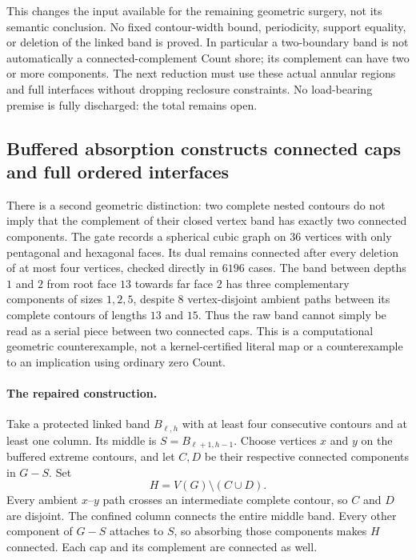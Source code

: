 This changes the input available for the remaining geometric surgery,
not its semantic conclusion. No fixed contour-width bound, periodicity,
support equality, or deletion of the linked band is proved. In particular
a two-boundary band is not automatically a connected-complement Count
shore; its complement can have two or more components. The next reduction must
use these actual annular regions and full interfaces without dropping
reclosure constraints. No load-bearing premise is fully discharged:
the total remains open.

\subsection{Buffered absorption constructs connected caps and full ordered interfaces}
\label{sec:buffered-contour-shell}

There is a second geometric distinction: two complete nested contours
do not imply that the complement of their closed vertex band has exactly
two connected components. The gate records a spherical cubic graph on
$36$ vertices with only pentagonal and hexagonal faces. Its dual remains
connected after every deletion of at most four vertices, checked directly
in $6196$ cases. The band between depths $1$ and $2$ from root face $13$
towards far face $2$ has three complementary components of sizes $1,2,5$,
despite $8$ vertex-disjoint ambient paths between its complete contours
of lengths $13$ and $15$. Thus the raw band cannot simply be read as
a serial piece between two connected caps. This is a computational
geometric counterexample, not a kernel-certified literal map or a
counterexample to an implication using ordinary zero Count.

\paragraph{The repaired construction.}
Take a protected linked band $B_{\ell,h}$ with at least four consecutive
contours and at least one column. Its middle is
$S=B_{\ell+1,h-1}$. Choose vertices $x$ and $y$ on the buffered extreme
contours, and let $C,D$ be their respective connected components in
$G-S$. Set
\[
                    H=V(G)\setminus(C\cup D).
\]
Every ambient $x$--$y$ path crosses an intermediate complete contour,
so $C$ and $D$ are disjoint. The confined column connects the entire
middle band. Every other component of $G-S$ attaches to $S$, so absorbing
those components makes $H$ connected. Each cap and its complement are
connected as well.

